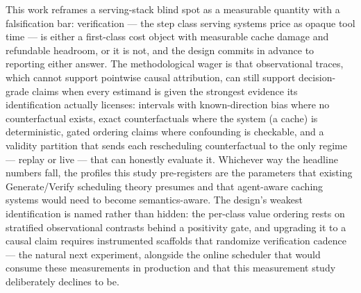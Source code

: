 \documentclass[11pt]{article}
\begin{document}
This work reframes a serving-stack blind spot as a measurable quantity with a falsification bar: verification --- the step class serving systems price as opaque tool time --- is either a first-class cost object with measurable cache damage and refundable headroom, or it is not, and the design commits in advance to reporting either answer. The methodological wager is that observational traces, which cannot support pointwise causal attribution, can still support decision-grade claims when every estimand is given the strongest evidence its identification actually licenses: intervals with known-direction bias where no counterfactual exists, exact counterfactuals where the system (a cache) is deterministic, gated ordering claims where confounding is checkable, and a validity partition that sends each rescheduling counterfactual to the only regime --- replay or live --- that can honestly evaluate it. Whichever way the headline numbers fall, the profiles this study pre-registers are the parameters that existing Generate/Verify scheduling theory presumes and that agent-aware caching systems would need to become semantics-aware. The design's weakest identification is named rather than hidden: the per-class value ordering rests on stratified observational contrasts behind a positivity gate, and upgrading it to a causal claim requires instrumented scaffolds that randomize verification cadence --- the natural next experiment, alongside the online scheduler that would consume these measurements in production and that this measurement study deliberately declines to be.



\end{document}
